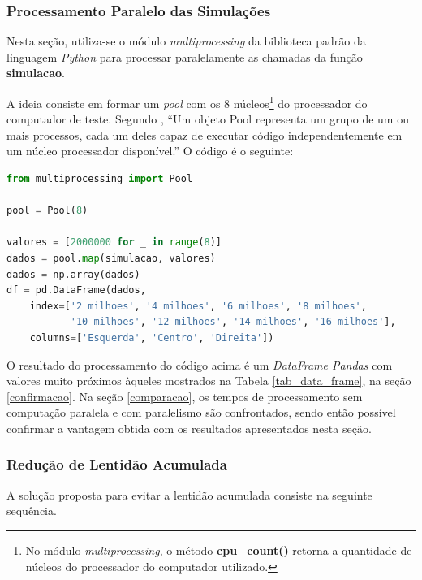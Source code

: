 \documentclass[12pt]{article}
\newcommand{\aspas}[1]{``#1''} %
\begin{document}
\subsubsection{Processamento Paralelo das Simulações}
\label{multiprocessing}

Nesta seção, utiliza-se o módulo \textit{multiprocessing} da biblioteca padrão da linguagem \textit{Python} para processar paralelamente as chamadas da função \textbf{simulacao}.

A ideia consiste em formar um \textit{pool} com os 8 núcleos\footnote{No módulo \textit{multiprocessing}, o método \textbf{cpu\_count()} retorna a quantidade de núcleos do processador do computador utilizado.} do processador do computador de teste. Segundo \cite{perkovic:2016}, \aspas{Um objeto Pool representa um grupo de um ou mais processos, cada um deles capaz de executar código independentemente em um núcleo processador disponível.} O código é o seguinte:

\begin{lstlisting}[language=Python]
from multiprocessing import Pool

pool = Pool(8)

valores = [2000000 for _ in range(8)]
dados = pool.map(simulacao, valores)
dados = np.array(dados)
df = pd.DataFrame(dados, 
	index=['2 milhoes', '4 milhoes', '6 milhoes', '8 milhoes', 
		   '10 milhoes', '12 milhoes', '14 milhoes', '16 milhoes'], 
	columns=['Esquerda', 'Centro', 'Direita'])
\end{lstlisting}

O resultado do processamento do código acima é um \textit{DataFrame Pandas} com valores muito próximos àqueles mostrados na Tabela \ref{tab_data_frame}, na seção \ref{confirmacao}. Na seção \ref{comparacao}, os tempos de processamento sem computação paralela e com paralelismo são confrontados, sendo então possível confirmar a vantagem obtida com os resultados apresentados nesta seção.

\subsubsection{Redução de Lentidão Acumulada}

A solução proposta para evitar a lentidão acumulada consiste na seguinte sequência.
\end{document}
